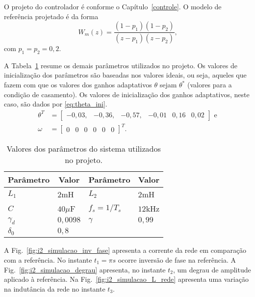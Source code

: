   O projeto do controlador é conforme o Capítulo~\ref{controle}. O modelo de referência projetado é da forma
  \begin{equation}
    W_m(z) = \frac{(1-p_1)(1-p_2)}{(z-p_1)(z-p_2)}\text{,}
    \label{eq:wm_simulacao}
  \end{equation}
  com $p_1 = p_2 = 0,2$.

	A Tabela~\ref{tab:parametros_projeto} resume os demais parâmetros utilizados no projeto. Os valores de inicialização dos parâmetros são baseadas nos valores ideais, ou seja, aqueles que fazem com que os valores dos ganhos adaptativos $\theta$ sejam $\theta^*$ (valores para a condição de casamento). Os valores de inicialização dos ganhos adaptativos, neste caso, são dados por \ref{eq:theta_ini}.
  \begin{equation}
    \begin{split}
      \theta^T & = \left[ \begin{matrix} -0,03, & -0,36, & -0,57, & -0,01 & 0,16 & 0,02 \end{matrix} \right]\text{ e}\\
      \omega & = {\left[ \begin{matrix} 0 & 0 & 0 & 0 & 0 & 0 \end{matrix} \right]}^T\text{.}
    \end{split}
    \label{eq:theta_ini}
  \end{equation}

  \begin{table}[htb]
    \renewcommand{\arraystretch}{1.35}
    \setlength{\tabcolsep}{1.2mm}
    \caption{Valores dos parâmetros do sistema utilizados no projeto.}
    \label{tab:parametros_projeto}
    \centering
    \begin{tabular}{l l l l}
      \hline
      \multicolumn{1}{c}{Parâmetro} & \multicolumn{1}{c}{Valor} &
      \multicolumn{1}{c}{Parâmetro} & \multicolumn{1}{c}{Valor} \\
      \hline
      $L_1$      & $2$mH    & $L_2$         & $2$mH  \\
      $C$        & $40\mu$F & $f_s = 1/T_s$ & $12$kHz\\
      $\gamma_d$ & $0,0098$ & $\gamma$      & $0,99$ \\
      $\delta_0$ & $0,8$    &               & \\
      \hline
    \end{tabular}
  \end{table}

  A Fig.~\ref{fig:i2_simulacao_inv_fase} apresenta a corrente da rede em comparação com a referência. No instante $t_1 = \pi s$ ocorre inversão de fase na referência. A Fig.~\ref{fig:i2_simulacao_degrau} apresenta, no instante $t_2$, um degrau de amplitude aplicado à referência. Na Fig.~\ref{fig:i2_simulacao_L_rede} apresenta uma variação na indutância da rede no instante $t_3$.

